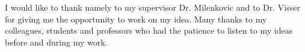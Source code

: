 \begin{dissacknowledgments}
\vspace{-0.4in} 
I would like to thank namely to my supervisor Dr. Milenkovic and to Dr. Visser for giving me the opportunity to work on my idea. Many thanks to my colleagues, students and professors who had the patience to listen to my ideas before and during my work.
\vspace{-0.3in}
\end{dissacknowledgments}

